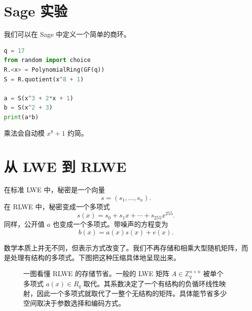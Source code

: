 \section{Sage 实验}

我们可以在 Sage 中定义一个简单的商环。

\begin{lstlisting}[language=Python]
q = 17
from random import choice
R.<x> = PolynomialRing(GF(q))
S = R.quotient(x^8 + 1)

a = S(x^3 + 2*x + 1)
b = S(x^2 + 3)
print(a*b)
\end{lstlisting}

乘法会自动模 $x^8+1$ 约简。

\section{从 LWE 到 RLWE}

在标准 LWE 中，秘密是一个向量
\[
s=(s_1,\dots,s_n).
\]
在 RLWE 中，秘密变成一个多项式
\[
s(x)=s_0+s_1x+\cdots+s_{255}x^{255}.
\]
同样，公开值 $a$ 也变成一个多项式。带噪声的方程变为
\[
b(x)=a(x)s(x)+e(x).
\]

数学本质上并无不同，但表示方式改变了。我们不再存储和相乘大型随机矩阵，而是处理有结构的多项式。下图把这种压缩具体地呈现出来。

\begin{figure}[H]
\centering
{}
\caption{一图看懂 RLWE 的存储节省。一般的 LWE 矩阵 $A\in\mathbb{Z}_q^{n\times n}$ 被单个多项式 $a(x)\in R_q$ 取代。其系数决定了一个有结构的负循环线性映射，因此一个多项式就取代了一整个无结构的矩阵。具体能节省多少空间取决于参数选择和编码方式。}
\label{fig:rlwe-compression}
\end{figure}

